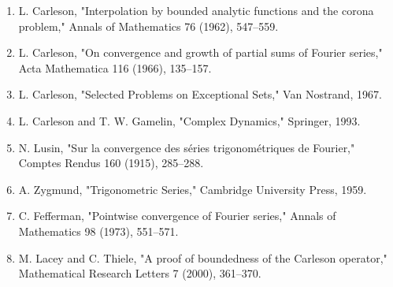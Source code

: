 \begin{enumerate}
\item L. Carleson, "Interpolation by bounded analytic functions and the corona problem," Annals of Mathematics 76 (1962), 547--559.
\item L. Carleson, "On convergence and growth of partial sums of Fourier series," Acta Mathematica 116 (1966), 135--157.
\item L. Carleson, "Selected Problems on Exceptional Sets," Van Nostrand, 1967.
\item L. Carleson and T. W. Gamelin, "Complex Dynamics," Springer, 1993.
\item N. Lusin, "Sur la convergence des s\'eries trigonom\'etriques de Fourier," Comptes Rendus 160 (1915), 285--288.
\item A. Zygmund, "Trigonometric Series," Cambridge University Press, 1959.
\item C. Fefferman, "Pointwise convergence of Fourier series," Annals of Mathematics 98 (1973), 551--571.
\item M. Lacey and C. Thiele, "A proof of boundedness of the Carleson operator," Mathematical Research Letters 7 (2000), 361--370.
\end{enumerate}
